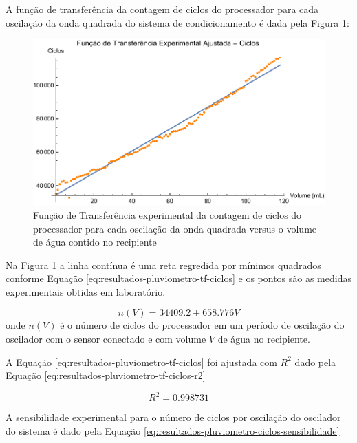 \documentclass[a4paper]{instrumentacao}
\begin{document}
A função de transferência da contagem de ciclos do processador para cada oscilação da onda quadrada do sistema de condicionamento é dada pela Figura \ref{fig:resultados-pluviometro-tf-ciclos}:

\begin{figure}[H]
	\centering \includegraphics[width=\textwidth]{Nivel/Experimental/Ciclos-Ajuste.pdf}
	\caption{Função de Transferência experimental da contagem de ciclos do processador para cada oscilação da onda quadrada versus o volume de água contido no recipiente}
	\label{fig:resultados-pluviometro-tf-ciclos}
\end{figure}


Na Figura \ref{fig:resultados-pluviometro-tf-ciclos} a linha contínua é uma reta regredida por mínimos quadrados conforme Equação \ref{eq:resultados-pluviometro-tf-ciclos} e os pontos são as medidas experimentais obtidas em laboratório.

\begin{equation}
	n(V) = 34409.2 + 658.776 V
	\label{eq:resultados-pluviometro-tf-ciclos}
\end{equation}
\noindent onde $n(V)$ é o número de ciclos do processador em um período de oscilação do oscilador com o sensor conectado e com volume $V$ de água no recipiente.

A Equação \ref{eq:resultados-pluviometro-tf-ciclos} foi ajustada com $R^2$ dado pela Equação \ref{eq:resultados-pluviometro-tf-ciclos-r2} 

\begin{equation}
	R^2 = 0.998731
	\label{eq:resultados-pluviometro-tf-ciclos-r2}
\end{equation}

A sensibilidade experimental para o número de ciclos por oscilação do oscilador do sistema é dado pela Equação \ref{eq:resultados-pluviometro-ciclos-sensibilidade}
\end{document}
